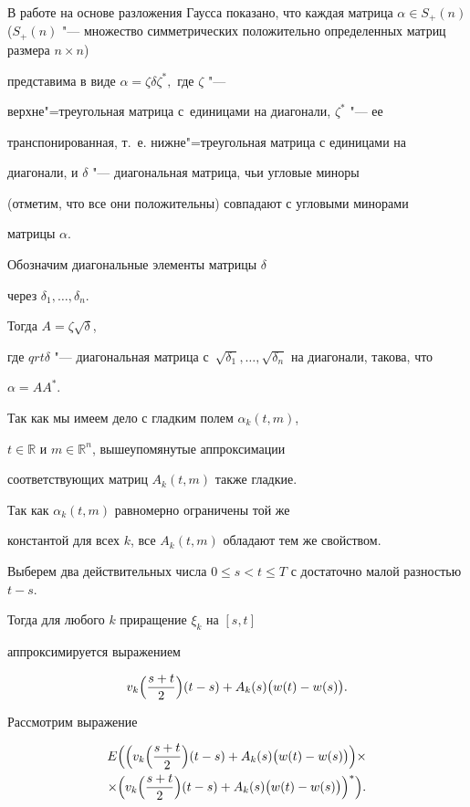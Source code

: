 В работе \cite{popovkoval:bib:GO} на основе разложения Гаусса показано, что каждая матрица ${\alpha\in S_+(n)}$ (${S_+(n)}$ "--- множество симметрических положительно определенных  матриц размера $n\times n$)

представима в виде $\alpha=\zeta\delta\zeta^*,$ где $\zeta$ "---

верхне"=треугольная матрица с~единицами на диагонали, $\zeta^*$ "--- ее

транспонированная, т.~е. нижне"=треугольная матрица с единицами на

диагонали, и $\delta$ "--- диагональная матрица, чьи угловые миноры

(отметим, что все они положительны) совпадают с угловыми минорами

матрицы $\alpha$. 

Обозначим диагональные элементы матрицы $\delta$

через $\delta_1,\dots,\delta_n$. 

Тогда $A=\zeta\sqrt{\delta}$, 

где $qrt{\delta}$ "--- диагональная матрица с~$\sqrt{\delta_1},\dots,\sqrt{\delta_n}$ на диагонали, такова, что

$\alpha=AA^*$.



Так как мы имеем дело с гладким полем  $\alpha_k(t,m)$,

$t\in \mathbb{R}$ и $m\in \mathbb{R}^n$, вышеупомянутые аппроксимации

              соответствующих матриц $A_k(t,m)$ также гладкие. 

Так как $\alpha_k(t,m)$ равномерно ограничены той же

              константой для всех $k$, все $A_k(t,m)$ обладают тем же свойством.

              Выберем два действительных числа $0\le s<t \le T$ с достаточно малой разностью $t-s$.

              Тогда для любого $k$ приращение $\xi_k$ на $[s,t]$

              аппроксимируется выражением 

$$v_k\Bigl({\frac {s+t}2}\Bigr)(t-s)+A_k(s)\bigl(w(t)-w(s)\bigr).$$

Рассмотрим выражение

\begin{multline}

E\Bigl(\Bigl(v_k \Bigl({\frac {s+t}2}\Bigr)(t-s)+A_k(s)\bigl(w(t)-w(s) \bigr)\Bigr)

\times

\\

\times

              \Bigr(v_k\Bigl({\frac {s+t}2}\Bigr)(t-s) +A_k(s)\bigl(w(t)-w(s)\bigr)\Bigr)^*\Bigr).

\end{multline}

